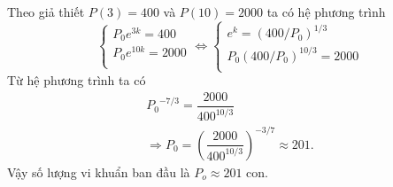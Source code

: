 Theo giả thiết  $P(3) = 400$ và $P(10) = 2000$ ta có hệ phương trình
$$\left\{\begin{array}{l}
		{{P}_{0}}{{e}^{3k}}=400 \\ 
		 {{P}_{0}}{{e}^{10k}}=2000 \\ 
	\end{array}\right.
\Leftrightarrow \left\{
	\begin{array}{l}
		{{e}^{k}}={{(400/{{P}_{0}})}^{1/3}} \\ 
		{{P}_{0}}{{(400/{{P}_{0}})}^{10/3}}=2000 \\ 
	\end{array}\right.$$
Từ hệ phương trình ta có
$$	\begin{array}{l}
{{P}_{0}}^{-7/3}=\dfrac{2000}{{{400}^{10/3}}}\\ \Rightarrow {{P}_{0}}={{\left( \dfrac{2000}{{{400}^{10/3}}} \right)}^{-3/7}}\approx 201.
 	\end{array}$$
Vậy số lượng vi khuẩn ban đầu là ${{P}_{o}}\approx 201$ con.
